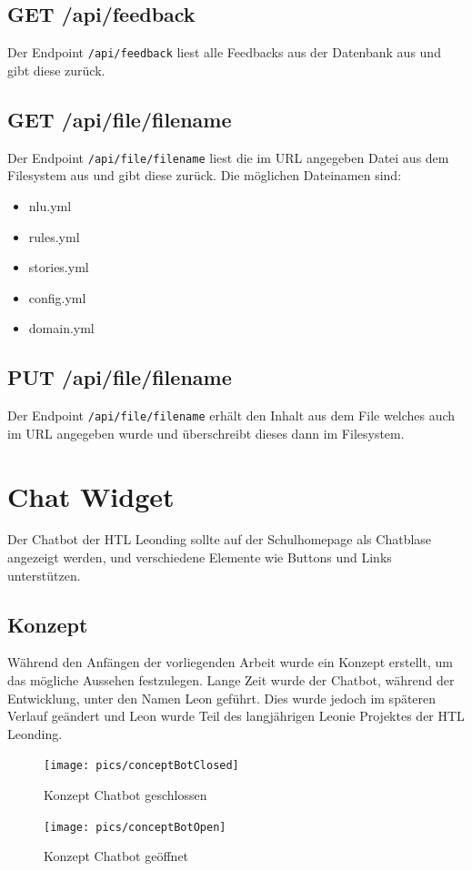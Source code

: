 \subsection{GET /api/feedback}
Der Endpoint \texttt{/api/feedback} liest alle Feedbacks aus der Datenbank aus und gibt diese zurück.

\subsection{GET /api/file/{filename}}
Der Endpoint \texttt{/api/file/{filename}} liest die im URL angegeben Datei aus dem Filesystem aus und gibt diese zurück.
Die möglichen Dateinamen sind:

\begin{itemize}
    \item nlu.yml
    \item rules.yml
    \item stories.yml
    \item config.yml
    \item domain.yml
\end{itemize}

\subsection{PUT /api/file/{filename}}
Der Endpoint \texttt{/api/file/{filename}} erhält den Inhalt aus dem File welches auch im URL angegeben wurde und überschreibt dieses dann im Filesystem.

\section{Chat Widget}\label{sec:chat-widget}
Der Chatbot der HTL Leonding sollte auf der Schulhomepage als Chatblase angezeigt werden, und verschiedene Elemente wie Buttons und Links unterstützen.

\subsection{Konzept}
Während den Anfängen der vorliegenden Arbeit wurde ein Konzept erstellt, um das mögliche Aussehen festzulegen.
Lange Zeit wurde der Chatbot, während der Entwicklung, unter den Namen Leon geführt.
Dies wurde jedoch im späteren Verlauf geändert und Leon wurde Teil des langjährigen Leonie Projektes der HTL Leonding.

\begin{figure}[hbt!]
    \centering
    \texttt{[image: pics/conceptBotClosed]}
    \caption{Konzept Chatbot geschlossen}
    \label{fig:impl:conceptBotClosed}
\end{figure}
\begin{figure}[hbt!]
    \centering
    \texttt{[image: pics/conceptBotOpen]}
    \caption{Konzept Chatbot geöffnet}
    \label{fig:impl:conceptBotOpen}
\end{figure}

